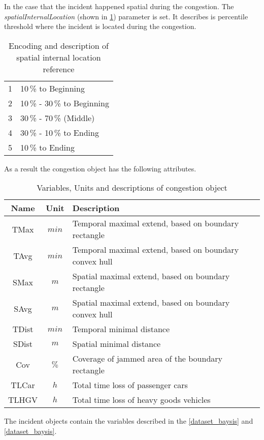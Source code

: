 In the case that the incident happened spatial during the congestion. The \textit{spatialInternalLocation} (shown in \cref{tbl:jam_classification_ILS}) parameter is set. It describes is percentile threshold where the incident is located during the congestion.
\begin{table}[ht]
	\centering
	\begin{tabular}{c|l}  
		1 & 10\,\% to Beginning \\
 		2 & 10\,\% - 30\,\% to Beginning \\
 		3 & 30\,\% - 70\,\% (Middle) \\
 		4 & 30\,\% - 10\,\% to Ending \\
 		5 & 10\,\% to Ending \\
	\end{tabular}
	\caption{Encoding and description of spatial internal location reference}
	\label{tbl:jam_classification_ILS}
	\vspace{-4mm}
\end{table}
    
As a result the congestion object has the following attributes.
\begin{table}[ht]
	\centering
	\begin{tabular}{c|c|l} 
		\toprule
		Name & Unit & Description \\
		\midrule 
		TMax  & $min$ & Temporal maximal extend, based on boundary rectangle \\
		TAvg  & $min$ & Temporal maximal extend, based on boundary convex hull \\
		SMax  & $m$   & Spatial maximal extend, based on boundary rectangle \\
		SAvg  & $m$   & Spatial maximal extend, based on boundary convex hull \\
		TDist & $min$ & Temporal minimal distance \\
		SDist & $m$   & Spatial minimal distance \\
		Cov   & $\%$  & Coverage of jammed area of the boundary rectangle \\
		TLCar & $h$   & Total time loss of passenger cars \\
		TLHGV & $h$   & Total time loss of heavy goods vehicles \\
		\bottomrule
	\end{tabular}
	\caption{Variables, Units and descriptions of congestion object}
\end{table}

The incident objects contain the variables described in the \cref{dataset_baysis} and \cref{dataset_baysis}.

